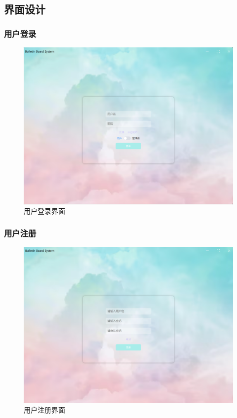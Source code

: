 \documentclass[UTF8]{ctexart}
\begin{document}
\subsection{界面设计}

\subsubsection{用户登录}

\begin{figure}[H]
  \centering
  \includegraphics[scale=0.3]{系统实现/登录.png}
  \caption{用户登录界面}
\end{figure}

\subsubsection{用户注册}

\begin{figure}[H]
  \centering
  \includegraphics[scale=0.3]{系统实现/注册.png}
  \caption{用户注册界面}
\end{figure}
\end{document}

